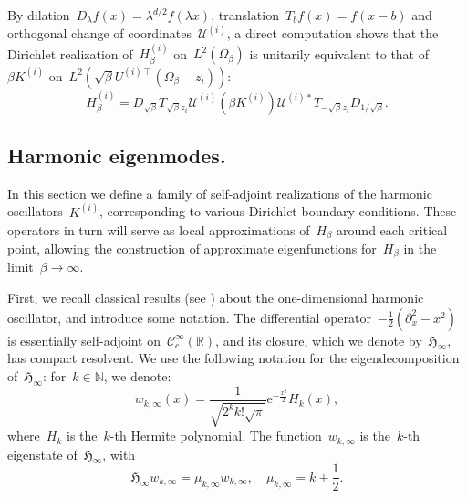 \documentclass[10pt]{article}
\newcommand{\e}{\mathrm{e}}
\newcommand{\R}{\mathbb{R}}
\newcommand{\N}{\mathbb N}
\newcommand{\1}{\mathbbm 1}
\newcommand{\Ki}[1]{K^{(i)}_{#1}}
\begin{document}
    By dilation~$D_\lambda f(x) = \lambda^{d/2}f(\lambda x)$, translation~$T_b f(x) = f(x-b)$ and orthogonal change of coordinates~$\mathcal U^{(i)}$, a direct computation shows that
    the Dirichlet realization of~$H_{\beta}^{(i)}$ on~$L^2(\Omega_\beta)$ is unitarily equivalent to that of~$\beta \Ki{}$ on~$L^2(\sqrt{\beta}U^{(i)\intercal}(\Omega_\beta-z_i))$:
    \begin{equation}
        \label{eq:harmonic_conjugation}
        H_{\beta}^{(i)} = D_{\sqrt\beta}T_{\sqrt\beta z_i}\mathcal U^{(i)}\left(\beta \Ki{}\right)\mathcal U^{(i)*}T_{-\sqrt\beta z_i}D_{1/\sqrt\beta}.
    \end{equation}


    \subsection{Harmonic eigenmodes.}
    In this section we define a family of self-adjoint realizations of the harmonic oscillators~$\Ki{}$, corresponding to various Dirichlet boundary conditions. These operators in turn will serve as local approximations of~$H_\beta$ around each critical point, allowing the construction of approximate eigenfunctions for~$H_\beta$ in the limit~$\beta\to\infty$.

    First, we recall classical results (see \cite{}) about the one-dimensional harmonic oscillator, and introduce some notation.
    The differential operator~$-\frac12\left(\partial_x^2-x^2\right)$ is essentially self-adjoint on~$\mathcal C_c^\infty(\R)$, and its closure, which we denote by~${\mathfrak H}_{\infty}$, has compact resolvent.
    We use the following notation for the eigendecomposition of~${\mathfrak H}_\infty$: for~$k\in\N$, we denote:
    \begin{equation}
        \label{eq:hermite_eigenfunction}
        w_{k,\infty}(x) = \frac{1}{\sqrt{2^k k! \sqrt\pi}}\e^{-\frac{x^2}2}H_k(x),
    \end{equation}
    where~$H_k$ is the~$k$-th Hermite polynomial. The function~$w_{k,\infty}$ is the~$k$-th eigenstate of~${\mathfrak H}_\infty$, with
    \begin{equation}
        \label{eq:hermite_eigenproblem}
         \mathfrak{H}_{\infty}w_{k,\infty} = \mu_{k,\infty} w_{k,\infty},\quad \mu_{k,\infty} = k + \frac12.
    \end{equation}
\end{document}
